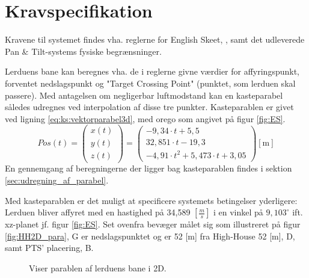 \section{Kravspecifikation}
\label{sec:kravspecifikation}
Kravene til systemet findes vha. reglerne for English Skeet, \citep{ES_regler},
samt det udleverede Pan \& Tilt-systems fysiske begrænsninger.


Lerduens bane kan beregnes vha. de i reglerne givne værdier for affyringspunkt, forventet nedslagspunkt
og "Target Crossing Point" (punktet, som lerduen skal passere).
Med antagelsen om negligerbar luftmodstand kan en kasteparabel således udregnes ved interpolation af disse tre punkter.
Kasteparablen er givet ved ligning \ref{eq:ks:vektorparabel3d}, med orego som angivet på figur \ref{fig:ES}.
\begin{equation}
Pos\left( t \right) = 
\left( \begin{matrix} 
	x\left( t \right)  \\ 
	y\left( t \right)  \\ 
	z\left( t \right)  \end{matrix} \right) =
	 \left( \begin{matrix} 
	- 9,34\cdot t+5,5 \\
  32,851\cdot t-19,3 \\ 
 -{ 4,91\cdot t }^{ 2 }+5,473\cdot t+3,05\end{matrix} \right) [\text{m}]
\label{eq:ks:vektorparabel3d}
\end{equation}
En gennemgang af beregningerne der ligger bag kasteparablen findes i sektion \ref{sec:udregning_af_parabel}.

Med kasteparablen er det muligt at specificere systemets betingelser yderligere:
Lerduen bliver affyret med en hastighed på 34,589 \([\frac{m}{s}]\) i en vinkel på \(9,103^{\circ}\) ift. xz-planet jf. figur \ref{fig:ES}.
Set ovenfra bevæger målet sig som illustreret på figur \ref{fig:HH2D_para}, G er nedslagspunktet og er 52 [m] fra High-House 52 [m], D, samt PTS' placering, B.\\
\begin{figure}[h!]
\centering
{}
\caption[Lerduens parabel i 2D]{Viser parablen af lerduens bane i 2D.}
\end{figure}

